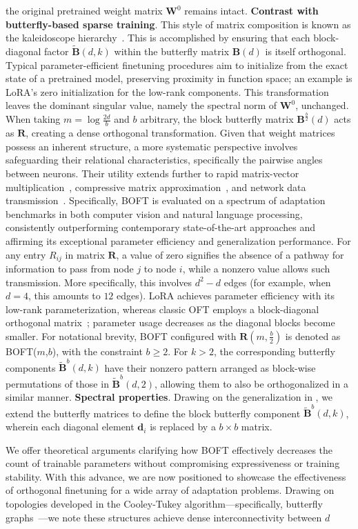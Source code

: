 the original pretrained weight matrix $\bm{W}^0$ remains intact. \textbf{Contrast with butterfly-based sparse training}. This style of matrix composition is known as the kaleidoscope hierarchy~\cite{dao2019kaleidoscope}. This is accomplished by ensuring that each block-diagonal factor $\tilde{\bm{B}}(d,k)$ within the butterfly matrix $\bm{B}(d)$ is itself orthogonal. Typical parameter-efficient finetuning procedures aim to initialize from the exact state of a pretrained model, preserving proximity in function space; an example is LoRA’s zero initialization for the low-rank components. This transformation leaves the dominant singular value, namely the spectral norm of $\bm{W}^0$, unchanged. When taking $m = \log \frac{2d}{b}$ and $b$ arbitrary, the block butterfly matrix $\bm{B}^{\frac{b}{2}}(d)$ acts as $\bm{R}$, creating a dense orthogonal transformation. Given that weight matrices possess an inherent structure, a more systematic perspective involves safeguarding their relational characteristics, specifically the pairwise angles between neurons. Their utility extends further to rapid matrix-vector multiplication~\cite{michielssen1996multilevel,o2010algorithm}, compressive matrix approximation~\cite{li2015butterfly}, and network data transmission~\cite{klasing1994broadcasting,li2003linear,rajasingh2016transmission}. Specifically, BOFT is evaluated on a spectrum of adaptation benchmarks in both computer vision and natural language processing, consistently outperforming contemporary state-of-the-art approaches and affirming its exceptional parameter efficiency and generalization performance. For any entry $R_{ij}$ in matrix $\bm{R}$, a value of zero signifies the absence of a pathway for information to pass from node $j$ to node $i$, while a nonzero value allows such transmission. More specifically, this involves $d^2 - d$ edges (for example, when $d=4$, this amounts to $12$ edges). LoRA achieves parameter efficiency with its low-rank parameterization, whereas classic OFT employs a block-diagonal orthogonal matrix~\cite{qiu2023controlling}; parameter usage decreases as the diagonal blocks become smaller. For notational brevity, BOFT configured with $\bm{R}(m,\frac{b}{2})$ is denoted as BOFT($m$,$b$), with the constraint $b \geq 2$. For $k>2$, the corresponding butterfly components $\tilde{\bm{B}}^b(d,k)$ have their nonzero pattern arranged as block-wise permutations of those in $\tilde{\bm{B}}^b(d,2)$, allowing them to also be orthogonalized in a similar manner. \textbf{Spectral properties}. Drawing on the generalization in \cite{chen2022pixelated}, we extend the butterfly matrices to define the block butterfly component $\tilde{\bm{B}}^b(d,k)$, wherein each diagonal element $\bm{d}_i$ is replaced by a $b\times b$ matrix. \item We offer theoretical arguments clarifying how BOFT effectively decreases the count of trainable parameters without compromising expressiveness or training stability. With this advance, we are now positioned to showcase the effectiveness of orthogonal finetuning for a wide array of adaptation problems. Drawing on topologies developed in the Cooley-Tukey algorithm—specifically, butterfly graphs~\cite{cooley1965algorithm}—we note these structures achieve dense interconnectivity between $d$ 